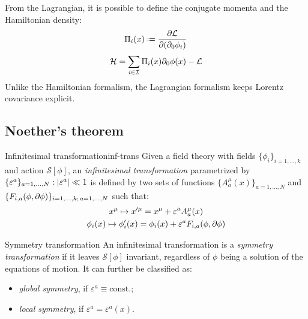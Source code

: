 From the Lagrangian, it is possible to define the conjugate momenta and the Hamiltonian density:
\begin{equation}
  \Pi_i(x) \defeq \frac{\pa \mathcal{L}}{\pa (\pa_0 \phi_i)}
\end{equation}
\begin{equation}
  \mathcal{H} = \sum_{i \in \mathcal{I}} \Pi_i(x) \partial_0 \phi(x) - \mathcal{L}
\end{equation}
Unlike the Hamiltonian formalism, the Lagrangian formalism keeps Lorentz covariance explicit.

\subsection{Noether's theorem}

\begin{definition}{Infinitesimal transformation}{inf-trans}
  Given a field theory with fields $ \{\phi_i\}_{i = 1, \dots, k} $ and action $ \mathcal{S}[\phi] $, an \textit{infinitesimal transformation} parametrized by $ \{\varepsilon^a\}_{a = 1, \dots, N} : \left\lvert\varepsilon^a\right\rvert \ll 1 $ is defined by two sets of functions $ \{A^\mu_a(x)\}_{a = 1, \dots, N} $ and $ \{F_{i,a}(\phi,\partial \phi)\}_{i = 1, \dots, k ;\, a = 1, \dots, N} $ such that:
  \begin{equation}
    \begin{gathered}
      x^\mu \mapsto x'^\mu = x^\mu + \varepsilon^a A^\mu_a(x) \\
      \phi_i(x) \mapsto \phi'_i(x) = \phi_i(x) + \varepsilon^a F_{i,a}(\phi, \partial \phi)
    \end{gathered}
    \label{eq:inf-transf}
  \end{equation}
\end{definition}

\begin{definition}{Symmetry transformation}{}
  An infinitesimal transformation is a \textit{symmetry transformation} if it leaves $ \mathcal{S}[\phi] $ invariant, regardless of $ \phi $ being a solution of the equations of motion. It can further be classified as:
  \begin{itemize}
    \item \textit{global symmetry}, if $ \varepsilon^a \equiv \mathrm{const.} $;
    \item \textit{local symmetry}, if $ \varepsilon^a = \varepsilon^a(x) $.
  \end{itemize}
\end{definition}

